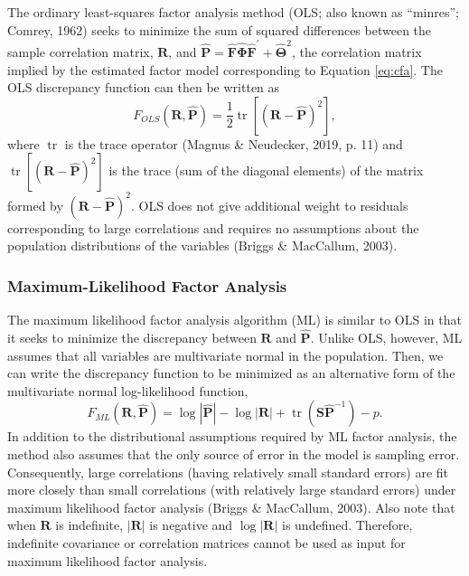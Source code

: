 \documentclass[
  english,
  man]{apa6}
\begin{document}
The ordinary least-squares factor analysis method (OLS; also known as ``minres''; Comrey, 1962) seeks to minimize the sum of squared differences between the sample correlation matrix, \(\mathbf{R}\), and \(\hat{\mathbf{P}} = \hat{\mathbf{F}}\hat{\mathbf{\Phi}}\hat{\mathbf{F}}^\prime + \hat{\mathbf{\Theta}}^2\), the correlation matrix implied by the estimated factor model corresponding to Equation \eqref{eq:cfa}. The OLS discrepancy function can then be written as
\begin{equation}
F_{OLS}(\mathbf{R}, \hat{\mathbf{P}}) = \frac{1}{2} \mathop{\mathrm{tr}}\left[ (\mathbf{R} - \hat{\mathbf{P}})^2 \right],
\label{eq:ls-discrepancy}
\end{equation}
where \(\mathop{\mathrm{tr}}\) is the trace operator (Magnus \& Neudecker, 2019, p. 11) and \(\mathop{\mathrm{tr}}\left[ (\mathbf{R} - \hat{\mathbf{P}})^2 \right]\) is the trace (sum of the diagonal elements) of the matrix formed by \((\mathbf{R} - \hat{\mathbf{P}})^2\). OLS does not give additional weight to residuals corresponding to large correlations and requires no assumptions about the population distributions of the variables (Briggs \& MacCallum, 2003).

\hypertarget{maximum-likelihood-factor-analysis}{%
\subsubsection{Maximum-Likelihood Factor Analysis}\label{maximum-likelihood-factor-analysis}}

The maximum likelihood factor analysis algorithm (ML) is similar to OLS in that it seeks to minimize the discrepancy between \(\mathbf{R}\) and \(\hat{\mathbf{P}}\). Unlike OLS, however, ML assumes that all variables are multivariate normal in the population. Then, we can write the discrepancy function to be minimized as an alternative form of the multivariate normal log-likelihood function,
\begin{equation}
F_{ML}(\mathbf{R}, \hat{\mathbf{P}}) = \log|\hat{\mathbf{P}}| - \log|\mathbf{R}| + \mathop{\mathrm{tr}}(\mathbf{S}\hat{\mathbf{P}}^{-1}) - p.
\label{eq:ml-discrepancy}
\end{equation}
In addition to the distributional assumptions required by ML factor analysis, the method also assumes that the only source of error in the model is sampling error. Consequently, large correlations (having relatively small standard errors) are fit more closely than small correlations (with relatively large standard errors) under maximum likelihood factor analysis (Briggs \& MacCallum, 2003). Also note that when \(\mathbf{R}\) is indefinite, \(|\mathbf{R}|\) is negative and \(\log |\mathbf{R}|\) is undefined. Therefore, indefinite covariance or correlation matrices cannot be used as input for maximum likelihood factor analysis.
\end{document}
